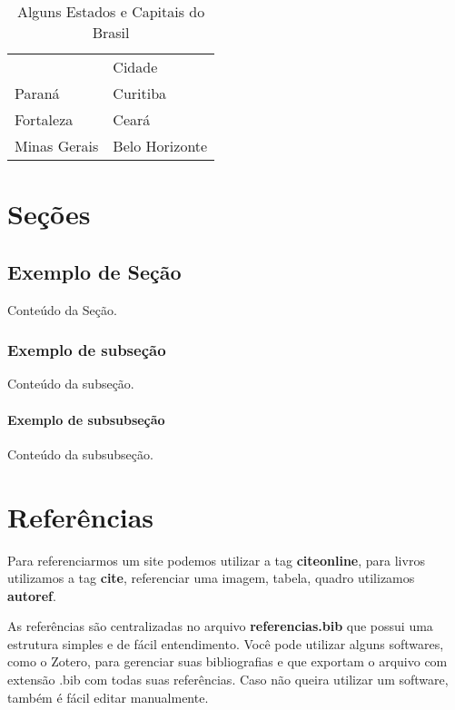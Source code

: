 \begin{table}[!htb]
	\centering
	\caption{Alguns Estados e Capitais do Brasil}
	\begin{tabular}{ll}
	\rowcolor[HTML]{CBCEFB}
	\multicolumn{1}{c}{\cellcolor[HTML]{CBCEFB}Estado} & Cidade         \\
	Paraná                                             & Curitiba       \\
	Fortaleza                                          & Ceará          \\
	Minas Gerais                                       & Belo Horizonte
	\end{tabular}
\end{table}

\chapter{Seções}

\section{Exemplo de Seção}

Conteúdo da Seção.

\subsection{Exemplo de subseção}

Conteúdo da subseção.

\subsubsection{Exemplo de subsubseção}

Conteúdo da subsubseção.

\chapter{Referências}

Para referenciarmos um site podemos utilizar a tag \textbf{citeonline},
para livros utilizamos a tag \textbf{cite}, referenciar uma imagem, tabela,
quadro utilizamos \textbf{autoref}.

As referências são centralizadas no arquivo \textbf{referencias.bib} 
que possui uma estrutura simples e de fácil entendimento. 
Você pode utilizar alguns softwares, como o Zotero, para gerenciar suas bibliografias
e que exportam o arquivo com extensão .bib com todas suas referências. 
Caso não queira utilizar um software, também é fácil editar manualmente.

